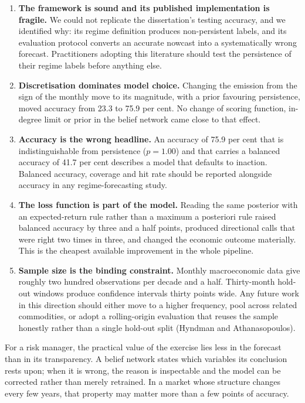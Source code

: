 \documentclass[11pt,a4paper]{article}
\begin{document}
\begin{enumerate}
\item \textbf{The framework is sound and its published implementation is fragile.} We could not
replicate the dissertation's testing accuracy, and we identified why: its regime definition
produces non-persistent labels, and its evaluation protocol converts an accurate nowcast into a
systematically wrong forecast. Practitioners adopting this literature should test the persistence
of their regime labels before anything else.
\item \textbf{Discretisation dominates model choice.} Changing the emission from the sign of the
monthly move to its magnitude, with a prior favouring persistence, moved accuracy from 23.3 to
75.9 per cent. No change of scoring function, in-degree limit or prior in the belief network came
close to that effect.
\item \textbf{Accuracy is the wrong headline.} An accuracy of 75.9 per cent that is
indistinguishable from persistence ($p = 1.00$) and that carries a balanced accuracy of 41.7 per
cent describes a model that defaults to inaction. Balanced accuracy, coverage and hit rate should
be reported alongside accuracy in any regime-forecasting study.
\item \textbf{The loss function is part of the model.} Reading the same posterior with an
expected-return rule rather than a maximum a posteriori rule raised balanced accuracy by three and
a half points, produced directional calls that were right two times in three, and changed the
economic outcome materially. This is the cheapest available improvement in the whole pipeline.
\item \textbf{Sample size is the binding constraint.} Monthly macroeconomic data give roughly two
hundred observations per decade and a half. Thirty-month hold-out windows produce confidence
intervals thirty points wide. Any future work in this direction should either move to a higher
frequency, pool across related commodities, or adopt a rolling-origin evaluation that reuses the
sample honestly rather than a single hold-out split (Hyndman and Athanasopoulos).
\end{enumerate}

For a risk manager, the practical value of the exercise lies less in the forecast than in its
transparency. A belief network states which variables its conclusion rests upon; when it is wrong,
the reason is inspectable and the model can be corrected rather than merely retrained. In a market
whose structure changes every few years, that property may matter more than a few points of
accuracy.
\end{document}
